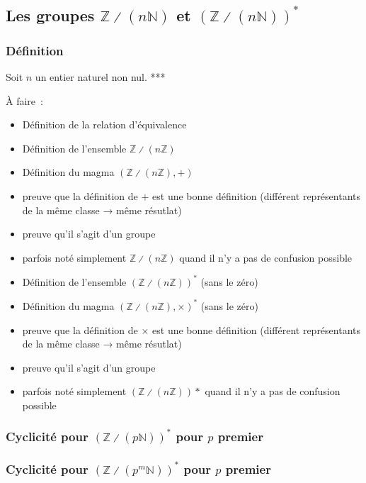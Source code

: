 \subsection{Les groupes \texorpdfstring{$\mathbb{Z} \divslash (n \mathbb{N})$}{Z / (n Z)} et \texorpdfstring{$\left(\mathbb{Z} \divslash (n \mathbb{N}) \right)^*$}{(Z / (n Z)) * }}

\subsubsection{Définition}

Soit $n$ un entier naturel non nul. 
*** 

À faire : 
\begin{itemize}[nosep]
    \item Définition de la relation d'équivalence
    \item Définition de l'ensemble $\mathbb{Z} \divslash (n \mathbb{Z})$
    \item Définition du magma $\left( \mathbb{Z} \divslash (n \mathbb{Z}), + \right)$
    \item preuve que la définition de $+$ est une bonne définition (différent représentants de la même classe → même résutlat)
    \item preuve qu'il s'agit d'un groupe
    \item parfois noté simplement $\mathbb{Z} \divslash (n \mathbb{Z})$ quand il n'y a pas de confusion possible
    \item Définition de l'ensemble $\left( \mathbb{Z} \divslash (n \mathbb{Z}) \right)^*$ (sans le zéro)
    \item Définition du magma $\left( \mathbb{Z} \divslash (n \mathbb{Z}), \times \right)^*$ (sans le zéro)
    \item preuve que la définition de $\times$ est une bonne définition (différent représentants de la même classe → même résutlat)
    \item preuve qu'il s'agit d'un groupe
    \item parfois noté simplement $\left( \mathbb{Z} \divslash (n \mathbb{Z}) \right) *$ quand il n'y a pas de confusion possible
\end{itemize}

\subsubsection{Cyclicité pour \texorpdfstring{$\left( \mathbb{Z} \divslash (p \mathbb{N}) \right)^*$}{(Z / p Z)*} pour \texorpdfstring{$p$}{p} premier}

\subsubsection{Cyclicité pour \texorpdfstring{$\left( \mathbb{Z} \divslash (p^m \mathbb{N}) \right)^*$}{(Z / p m Z)*} pour \texorpdfstring{$p$}{p} premier}
